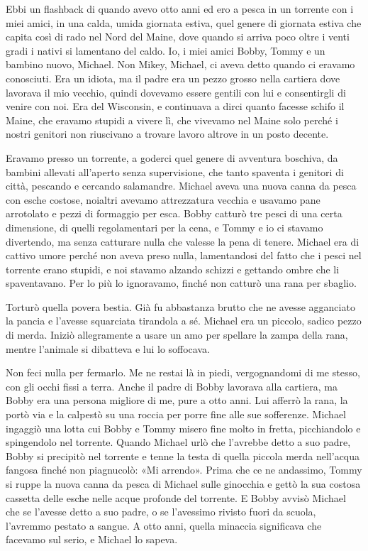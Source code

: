 \hfill\break

Ebbi un flashback di quando avevo otto anni ed ero a pesca in un
torrente con i miei amici, in una calda, umida giornata estiva, quel
genere di giornata estiva che capita così di rado nel Nord del Maine,
dove quando si arriva poco oltre i venti gradi i nativi si lamentano del
caldo. Io, i miei amici Bobby, Tommy e un bambino nuovo, Michael. Non
Mikey, Michael, ci aveva detto quando ci eravamo conosciuti. Era un
idiota, ma il padre era un pezzo grosso nella cartiera dove lavorava il
mio vecchio, quindi dovevamo essere gentili con lui e consentirgli di
venire con noi. Era del Wisconsin, e continuava a dirci quanto facesse
schifo il Maine, che eravamo stupidi a vivere lì, che vivevamo nel Maine
solo perché i nostri genitori non riuscivano a trovare lavoro altrove in
un posto decente.

Eravamo presso un torrente, a goderci quel genere di avventura boschiva,
da bambini allevati all'aperto senza supervisione, che tanto spaventa i
genitori di città, pescando e cercando salamandre. Michael aveva una
nuova canna da pesca con esche costose, noialtri avevamo attrezzatura
vecchia e usavamo pane arrotolato e pezzi di formaggio per esca. Bobby
catturò tre pesci di una certa dimensione, di quelli regolamentari per
la cena, e Tommy e io ci stavamo divertendo, ma senza catturare nulla
che valesse la pena di tenere. Michael era di cattivo umore perché non
aveva preso nulla, lamentandosi del fatto che i pesci nel torrente erano
stupidi, e noi stavamo alzando schizzi e gettando ombre che li
spaventavano. Per lo più lo ignoravamo, finché non catturò una rana per
sbaglio.

Torturò quella povera bestia. Già fu abbastanza brutto che ne avesse
agganciato la pancia e l'avesse squarciata tirandola a sé. Michael era
un piccolo, sadico pezzo di merda. Iniziò allegramente a usare un amo
per spellare la zampa della rana, mentre l'animale si dibatteva e lui lo
soffocava.

Non feci nulla per fermarlo. Me ne restai là in piedi, vergognandomi di
me stesso, con gli occhi fissi a terra. Anche il padre di Bobby lavorava
alla cartiera, ma Bobby era una persona migliore di me, pure a otto
anni. Lui afferrò la rana, la portò via e la calpestò su una roccia per
porre fine alle sue sofferenze. Michael ingaggiò una lotta cui Bobby e
Tommy misero fine molto in fretta, picchiandolo e spingendolo nel
torrente. Quando Michael urlò che l'avrebbe detto a suo padre, Bobby si
precipitò nel torrente e tenne la testa di quella piccola merda
nell'acqua fangosa finché non piagnucolò: «Mi arrendo». Prima che ce ne
andassimo, Tommy si ruppe la nuova canna da pesca di Michael sulle
ginocchia e gettò la sua costosa cassetta delle esche nelle acque
profonde del torrente. E Bobby avvisò Michael che se l'avesse detto a
suo padre, o se l'avessimo rivisto fuori da scuola, l'avremmo pestato a
sangue. A otto anni, quella minaccia significava che facevamo sul serio,
e Michael lo sapeva.

